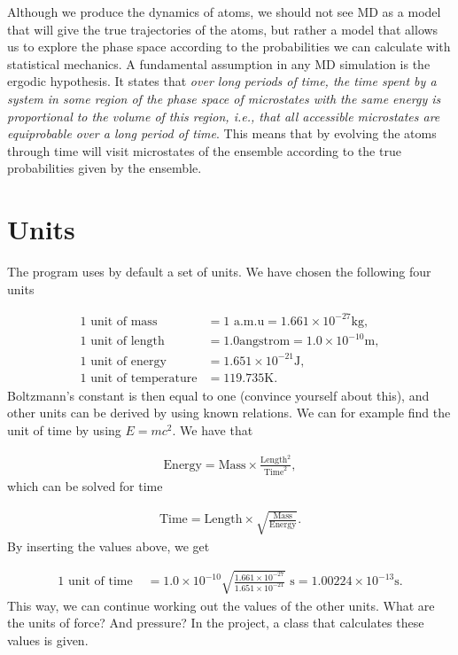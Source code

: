 \documentclass[%
oneside,                 %
final,                   %
10pt]{article}
\begin{document}
Although we produce the dynamics of atoms, we should not see MD as a model that will give the true trajectories of the atoms, but rather a model that allows us to explore the phase space according to the probabilities we can calculate with statistical mechanics. A fundamental assumption in any MD simulation is the ergodic hypothesis. It states that \emph{over long periods of time, the time spent by a system in some region of the phase space of microstates with the same energy is proportional to the volume of this region, i.e., that all accessible microstates are equiprobable over a long period of time}. This means that by evolving the atoms through time will visit microstates of the ensemble according to the true probabilities given by the ensemble.

\section{Units}

The program uses by default a set of units. We have chosen the following four units

\begin{align}
	\text{1 unit of mass } &= 1 \text{ a.m.u} = 1.661\times 10^{-27}\mathrm{kg},\\
	\text{1 unit of length } &= 1.0 \mathrm{angstrom} = 1.0\times 10^{-10}\mathrm{m},\\
	\text{1 unit of energy } &= 1.651\times 10^{-21}\mathrm{J},\\
	\text{1 unit of temperature} &= 119.735\mathrm{K}.
\end{align}
Boltzmann's constant is then equal to one (convince yourself about this), and other units can be derived by using known relations. We can for example find the unit of time by using $E=mc^2$. We have that

\begin{align}
	\text{Energy} = \text{Mass} \times \frac{\text{Length}^2}{\text{Time}^2},
\end{align}
which can be solved for time

\begin{align}
	\text{Time} = \text{Length} \times \sqrt{\frac{\text{Mass}}{\text{Energy}}}.
\end{align}
By inserting the values above, we get

\begin{align}
	\text{1 unit of time } &= 1.0 \times 10^{-10}\sqrt{\frac{1.661\times 10^{-27}}{1.651\times 10^{-21}}} \text{ s} = 1.00224\times 10^{-13}\mathrm{s}.
\end{align}
This way, we can continue working out the values of the other units. What are the units of force? And pressure? In the project, a class that calculates these values is given.
\end{document}
